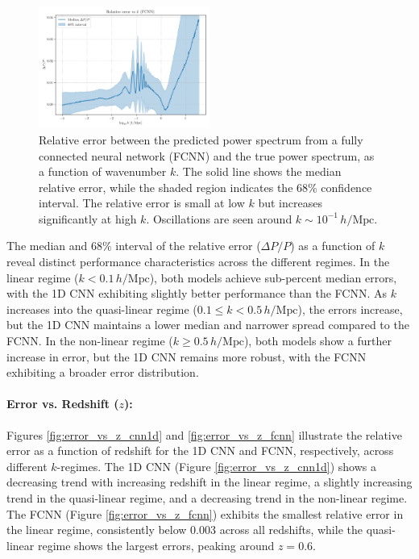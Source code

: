 \documentclass[twocolumn]{aastex631}
\begin{document}
\begin{figure}[h]
    \centering
    \includegraphics[width=0.5\textwidth]{../Project4/plots/error_vs_k_fcnn_4_1745408320.png}
    \caption{\label{fig:error_vs_k_fcnn}Relative error between the predicted power spectrum from a fully connected neural network (FCNN) and the true power spectrum, as a function of wavenumber $k$. The solid line shows the median relative error, while the shaded region indicates the 68\% confidence interval. The relative error is small at low $k$ but increases significantly at high $k$. Oscillations are seen around $k \sim 10^{-1} \, h/\mathrm{Mpc}$.}
\end{figure}

The median and 68\% interval of the relative error ($\Delta P/P$) as a function of $k$ reveal distinct performance characteristics across the different regimes. In the linear regime ($k < 0.1\,h/\mathrm{Mpc}$), both models achieve sub-percent median errors, with the 1D CNN exhibiting slightly better performance than the FCNN. As $k$ increases into the quasi-linear regime ($0.1 \leq k < 0.5\,h/\mathrm{Mpc}$), the errors increase, but the 1D CNN maintains a lower median and narrower spread compared to the FCNN. In the non-linear regime ($k \geq 0.5\,h/\mathrm{Mpc}$), both models show a further increase in error, but the 1D CNN remains more robust, with the FCNN exhibiting a broader error distribution.

\paragraph{Error vs. Redshift ($z$):}

Figures \ref{fig:error_vs_z_cnn1d} and \ref{fig:error_vs_z_fcnn} illustrate the relative error as a function of redshift for the 1D CNN and FCNN, respectively, across different $k$-regimes. The 1D CNN (Figure \ref{fig:error_vs_z_cnn1d}) shows a decreasing trend with increasing redshift in the linear regime, a slightly increasing trend in the quasi-linear regime, and a decreasing trend in the non-linear regime. The FCNN (Figure \ref{fig:error_vs_z_fcnn}) exhibits the smallest relative error in the linear regime, consistently below 0.003 across all redshifts, while the quasi-linear regime shows the largest errors, peaking around $z=0.6$.
\end{document}
